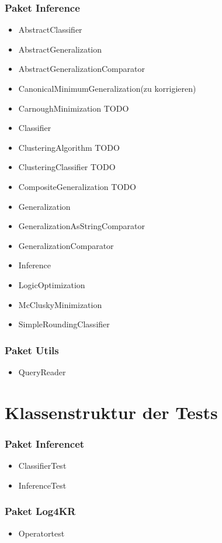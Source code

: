 \documentclass[a4paper, 11pt]{book}
\begin{document}
\subsubsection{Paket Inference}
\begin{itemize}
	\item AbstractClassifier
	\item AbstractGeneralization
	\item AbstractGeneralizationComparator
	\item CanonicalMinimumGeneralization(zu korrigieren)
	\item CarnoughMinimization TODO
	\item Classifier
	\item ClusteringAlgorithm TODO
	\item ClusteringClassifier TODO
	\item CompositeGeneralization TODO
	\item Generalization
	\item GeneralizationAsStringComparator
	\item GeneralizationComparator
	\item Inference
	\item LogicOptimization
	\item McCluskyMinimization
	\item SimpleRoundingClassifier
\end{itemize}
\subsubsection{Paket Utils}
\begin{itemize}
	\item QueryReader
\end{itemize}
\section{Klassenstruktur der Tests}
\subsubsection{Paket Inferencet}
\begin{itemize}
	\item ClassifierTest
	\item InferenceTest
\end{itemize}
\subsubsection{Paket Log4KR}
\begin{itemize}
	\item Operatortest
\end{itemize}
\end{document}
